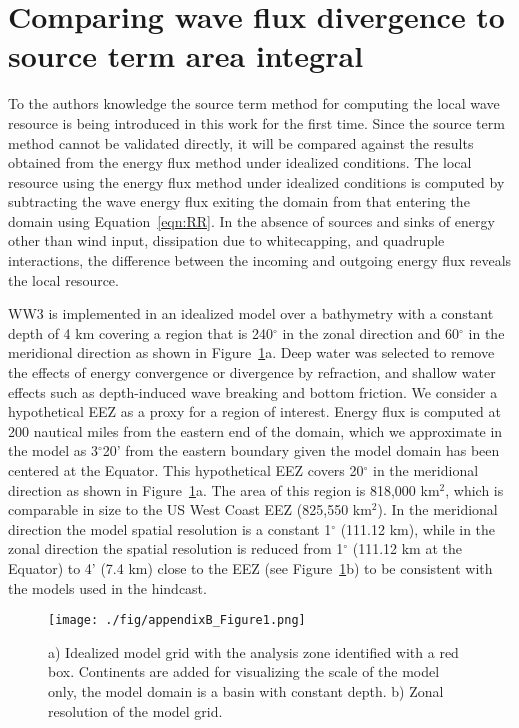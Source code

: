 \section{Comparing wave flux divergence to source term area integral}\label{appendix:flux-vs-area}

To the authors knowledge the source term method for computing the local wave resource is being introduced in this work for the first time. Since the source term method cannot be validated directly, it will be compared against the results obtained from the energy flux method under idealized conditions. The local resource using the energy flux method under idealized conditions is computed by subtracting the wave energy flux exiting the domain from that entering the domain using Equation~\eqref{eqn:RR}. In the absence of sources and sinks of energy other than wind input, dissipation due to whitecapping, and quadruple interactions, the difference between the incoming and outgoing energy flux reveals the local resource.

WW3 is implemented in an idealized model over a bathymetry with a constant depth of 4 km covering a region that is 240$^{\circ}$ in the zonal direction and 60$^{\circ}$ in the meridional direction as shown in Figure~\ref{fig:idealizedDomain}a. Deep water was selected to remove the effects of energy convergence or divergence by refraction, and shallow water effects such as depth-induced wave breaking and bottom friction. We consider a hypothetical EEZ as a proxy for a region of interest. Energy flux is computed at 200 nautical miles from the eastern end of the domain, which we approximate in the model as 3$^{\circ}$20’ from the eastern boundary given the model domain has been centered at the Equator. This hypothetical EEZ covers 20$^{\circ}$ in the meridional direction as shown in Figure~\ref{fig:idealizedDomain}a. The area of this region is 818,000 km$^{2}$, which is comparable in size to the US West Coast EEZ (825,550 km$^{2}$). In the meridional direction the model spatial resolution is a constant 1$^{\circ}$ (111.12 km), while in the zonal direction the spatial resolution is reduced from 1$^{\circ}$ (111.12 km at the Equator) to 4’ (7.4 km) close to the EEZ (see Figure~\ref{fig:idealizedDomain}b) to be consistent with the models used in the hindcast.
 
\begin{figure}[ht]
  \texttt{[image: ./fig/appendixB\_Figure1.png]}
  \caption{a) Idealized model grid with the analysis zone identified with a red box. Continents are added for visualizing the scale of the model only, the model domain is a basin with constant depth. b) Zonal resolution of the model grid.}
  \label{fig:idealizedDomain}
\end{figure}

